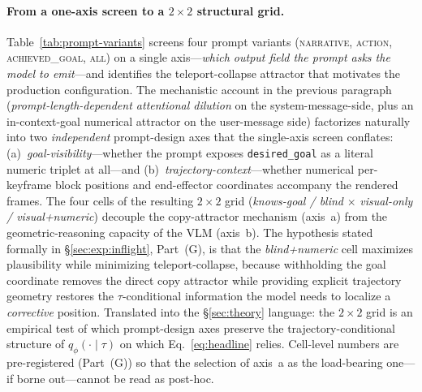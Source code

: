 \documentclass{article}
\begin{document}
\paragraph{From a one-axis screen to a $2\!\times\!2$ structural grid.}
Table~\ref{tab:prompt-variants} screens four prompt variants
(\textsc{narrative}, \textsc{action}, \textsc{achieved\_goal},
\textsc{all}) on a single axis---\emph{which output field the prompt
asks the model to emit}---and identifies the teleport-collapse attractor
that motivates the production configuration. The mechanistic account in
the previous paragraph (\emph{prompt-length-dependent attentional
dilution} on the system-message-side, plus an in-context-goal numerical
attractor on the user-message side) factorizes naturally into two
\emph{independent} prompt-design axes that the single-axis screen
conflates: (a)~\emph{goal-visibility}---whether the prompt exposes
\texttt{desired\_goal} as a literal numeric triplet at all---and
(b)~\emph{trajectory-context}---whether numerical per-keyframe block
positions and end-effector coordinates accompany the rendered frames.
The four cells of the resulting $2\!\times\!2$ grid (\emph{knows-goal /
blind} $\times$ \emph{visual-only / visual+numeric}) decouple the
copy-attractor mechanism (axis~a) from the geometric-reasoning capacity
of the VLM (axis~b). The hypothesis stated formally in
\S\ref{sec:exp:inflight}, Part~(G), is that the \emph{blind+numeric}
cell maximizes plausibility while minimizing teleport-collapse, because
withholding the goal coordinate removes the direct copy attractor while
providing explicit trajectory geometry restores the
$\tau$-conditional information the model needs to localize a
\emph{corrective} position. Translated into the
\S\ref{sec:theory} language: the $2\!\times\!2$ grid is an empirical
test of which prompt-design axes preserve the trajectory-conditional
structure of $q_\phi(\cdot\!\mid\!\tau)$ on which Eq.~\eqref{eq:headline}
relies. Cell-level numbers are pre-registered (Part~(G)) so that the
selection of axis~a as the load-bearing one---if borne out---cannot be
read as post-hoc.
\end{document}
